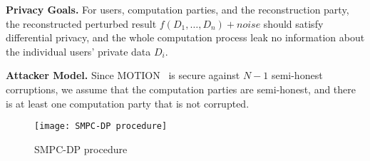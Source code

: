 \textbf{Privacy Goals.}
For users, computation parties, and the reconstruction party, the reconstructed perturbed result $f\left(D_1,\ldots, D_n\right) +noise$ should satisfy differential privacy, and the whole computation process leak no information about the individual users' private data $D_i$.

\textbf{Attacker Model.}
Since MOTION~\cite{braun2022motion} is secure against $N-1$ semi-honest corruptions, we assume that the computation parties are semi-honest, and there is at least one computation party that is not corrupted.

\begin{figure}[htbp]
      \texttt{[image: SMPC-DP procedure]}
      \centering
      \caption{SMPC-DP procedure}
      \label{img:MPCDPProcedure}
\end{figure}
\FloatBarrier






